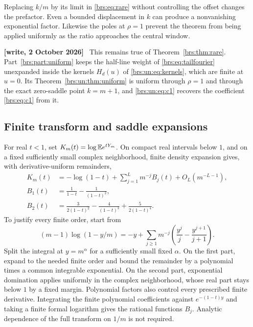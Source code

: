 \documentclass[11pt]{article}
\numberwithin{equation}{section}
\theoremstyle{remark}\newtheorem{remark}[theorem]{Remark}
\newenvironment{writenote}{\par\smallskip\begingroup\small\noindent\textbf{[write, 2 October 2026]}\ }{\par\endgroup\smallskip}
\begin{document}
Replacing $k/m$ by its limit in \eqref{brs:eq:rare} without controlling the
offset changes the prefactor.  Even a bounded displacement in $k$ can
produce a nonvanishing exponential factor.  Likewise the poles at
$\rho=1$ prevent the theorem from being applied uniformly as the ratio
approaches the central window.

\begin{writenote}
This remains true of Theorem~\ref{brs:thm:rare}. Part~\ref{brs:part:uniform} keeps the half-line weight of \eqref{brs:eq:tailfourier} unexpanded inside the kernels $H_d(u)$ of \eqref{brs:un:eq:kernels}, which are finite at $u=0$. Its Theorem~\ref{brs:un:thm:uniform} is uniform through $\rho=1$ and through the exact zero-saddle point $k=m+1$, and \eqref{brs:un:eq:c1} recovers the coefficient \eqref{brs:eq:c1} from it.
\end{writenote}

\subsection{Finite transform and saddle expansions}

For real $t<1$, set $K_m(t)=\log\mathbb E e^{tY_m}$.  On compact real intervals
below $1$, and on a fixed sufficiently small complex neighborhood,
finite density expansion gives, with derivative-uniform remainders,
\begin{align}\label{brs:eq:Kexp}
 K_m(t)&=-\log(1-t)+\sum_{j=1}^{L}m^{-j}B_j(t)+O_L(m^{-L-1}),\\
 B_1(t)&=\frac1{1-t}-\frac1{(1-t)^2},\nonumber\\
 B_2(t)&=\frac3{2(1-t)^2}-\frac4{(1-t)^3}
            +\frac5{2(1-t)^4}.\nonumber
\end{align}
To justify every finite order, start from
\begin{equation}\label{brs:eq:logdensity}
 (m-1)\log(1-y/m)
 =-y+\sum_{j\geq1}m^{-j}
 \left(\frac{y^j}{j}-\frac{y^{j+1}}{j+1}\right).
\end{equation}
Split the integral at $y=m^\alpha$ for a sufficiently small fixed
$\alpha$.  On the first part, expand to the needed finite order and
bound the remainder by a polynomial times a common integrable
exponential.  On the second part, exponential domination applies
uniformly in the complex neighborhood, whose real part stays below
$1$ by a fixed margin.  Polynomial factors also control every prescribed
finite derivative.  Integrating the finite polynomial coefficients
against $e^{-(1-t)y}$ and taking a finite formal logarithm gives the
rational functions $B_j$.  Analytic dependence of the full transform on
$1/m$ is not required.
\end{document}
